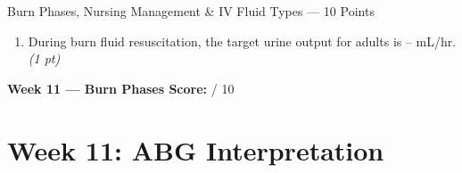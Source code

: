 \documentclass[11pt,letterpaper]{article}
\newcommand{\blank}[1][3cm]{\underline{\hspace{#1}}}
\begin{document}
\begin{diagbox}{Burn Phases, Nursing Management \& IV Fluid Types --- 10 Points}
\begin{enumerate}[leftmargin=1.5em, label=\textbf{\arabic*.},start=121]
  \item During burn fluid resuscitation, the target urine output for adults is
        \blank[2cm]--\blank[2cm] mL/hr.
        \hfill\textit{(1 pt)}

\end{enumerate}

\vspace{0.3cm}
\textbf{Week 11 --- Burn Phases Score:} \blank[1cm] / 10
\end{diagbox}

\newpage

\section{Week 11: ABG Interpretation}
\end{document}
